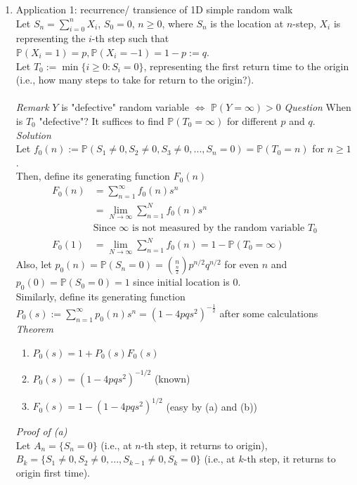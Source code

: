 \documentclass[11pt]{article}
\begin{document}
\begin{enumerate}
\item Application 1: recurrence/ transience of 1D simple random walk \\
Let $S_n = \sum_{i=0}^{n} X_i$, $S_0 =0$, $n \geq 0$, where $S_n$ is the location at $n$-step, $X_i$ is representing the $i$-th step such that $\mathbb{P}(X_i =1)= p, \mathbb{P}(X_i = -1)= 1-p := q$.\\
Let $T_0 := \min \{i \geq 0 : S_{i} =0\}$, representing the first return time to the origin (i.e., how many steps to take for return to the origin?).\\\\
\textit{Remark} $Y$ is "defective" random variable $\iff$ $\mathbb{P}(Y = \infty) >0$ \newpage
\textit{Question} When is $T_0$ "defective"? It suffices to find $\mathbb{P}(T_0 = \infty)$ for different $p$ and $q$.\\
\textit{Solution}\\
Let $f_0 (n) := \mathbb{P}(S_1 \neq 0, S_2 \neq 0, S_3 \neq 0, ..., S_n = 0) = \mathbb{P}(T_0 =n)$ for $n \geq 1$.\\
Then, define its generating function $F_0(n)$
\begin{align*}
F_0(n) &= \sum_{n=1}^{\infty} f_0 (n) s^n\\
&= \lim_{N \to \infty} \sum_{n=1}^{N} f_0 (n) s^n\\
&\text{Since $\infty$ is not measured by the random variable $T_0$}\\
F_0(1) &= \lim_{N \to \infty} \sum_{n=1}^{N} f_0 (n) = 1 - \mathbb{P}(T_0 = \infty)
\end{align*}
Also, let $p_0 (n) = \mathbb{P}(S_n =0) = {{n} \choose {\frac{n}{2}}} p^{n/2} q^{n/2}$ for even $n$ and $p_0 (0) =  \mathbb{P}(S_0 =0) = 1$ since initial location is $0$.\\
Similarly, define its generating function $P_0(s) := \sum_{n=1}^{\infty} p_0 (n) s^n = (1-4pq s^2)^{-\frac{1}{2}}$ after some calculations\\
\textit{Theorem}
\begin{enumerate}
\item $P_0 (s) = 1+ P_0 (s)F_0 (s)$
\item $P_0 (s) = (1-4pq s^2)^{-1/2}$ (known)
\item $F_0 (s) = 1 - (1-4pq s^2)^{1/2}$ (easy by (a) and (b))
\end{enumerate}
\textit{Proof of (a)}\\
Let $A_n = \{S_{n} =0 \}$ (i.e., at $n$-th step, it returns to origin),\\
$B_{k} = \{S_1 \neq 0, S_2 \neq 0, ..., S_{k-1} \neq 0, S_{k} =0\}$ (i.e., at $k$-th step, it returns to origin first time).\\

\end{enumerate}
\end{document}
